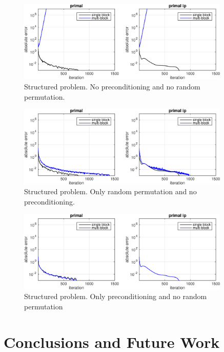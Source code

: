 \documentclass{article}
\begin{document}
{\newpage
\begin{figure}[ht!]
	\centering
	\includegraphics[width=0.9\textwidth]{../figures/struct_noprecond_norndperm.png}
	\caption{Structured problem. No preconditioning and no random permutation.}
	\label{fig:struct_nop_nor}
\end{figure}
\begin{figure}[ht!]
	\centering
	\includegraphics[width=0.9\textwidth]{../figures/struct_noprecond_rndperm.png}
	\caption{Structured problem. Only random permutation and no preconditioning.}
	\label{fig:struct_nop_r}
\end{figure}
\begin{figure}[ht!]
	\centering
	\includegraphics[width=0.9\textwidth]{../figures/struct_precond_norndperm.png}
	\caption{Structured problem. Only preconditioning and  no random permutation}
	\label{fig:struct_p_nor}
\end{figure}


\newpage
\vspace{0.5in}
\section{Conclusions and Future Work}

}
\end{document}

